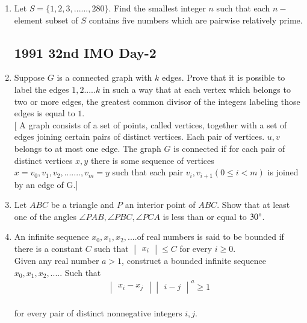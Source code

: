 \documentclass[12pt,-letter paper]{article}
\providecommand{\mydet}[1]{\ensuremath{\begin{vmatrix}#1\end{vmatrix}}}
\providecommand{\brak}[1]{\ensuremath{\left(#1\right)}}
\begin{document}
\begin{enumerate}
  \item Let $S = \{1,2,3,......,280\}$. Find the smallest integer $n$ such that each $n-$ element subset of $S$ contains five numbers which are pairwise relatively prime.

	  \subsection*{1991 32nd IMO Day-2}

  \item Suppose $G$ is a connected graph with $k$ edges. Prove that it is possible to label the edges $1,2.....k$ in such a way that at each vertex which belongs to two or more edges, the greatest common divisor of the integers labeling those edges is equal to $1$.\\
	  $[$ A graph consists of a set of points, called vertices, together with a set of edges joining certain pairs of distinct vertices. Each pair of vertices. $u, v$ belongs to at most one edge. The graph $G$ is connected if for cach pair of distinct vertices $x, y$ there is some sequence of vertices   $x=v_0,v_1,v_2,.......,v_m = y$  such that each pair $v_i,v_{i+1}\brak{0\leq i < m}$ is joined by an edge of G$.]$

  \item Let $ABC$ be a triangle and $P$ an interior point of $ABC$. Show that at least one of the angles $\angle{PAB}, \angle{PBC}, \angle{PCA}$ is less than or equal to $30\degree$.

  \item An infinite sequence $x_0, x_1, x_2,.... $of real numbers is said to be bounded if there is a constant $C$ such that $\mydet{x_i} \leq C$ for every $i \geq 0$.\\
	  Given any real number $a > 1$, construct a bounded infinite sequence $x_0, x_1, x_2,.....$ Such that\\
	  \begin{align*}\mydet{x_i-x_j}\mydet{i-j}^a \geq 1 \end{align*}\\
	  for every pair of distinct nonnegative integers $i, j$.


\end{enumerate}
\end{document}
